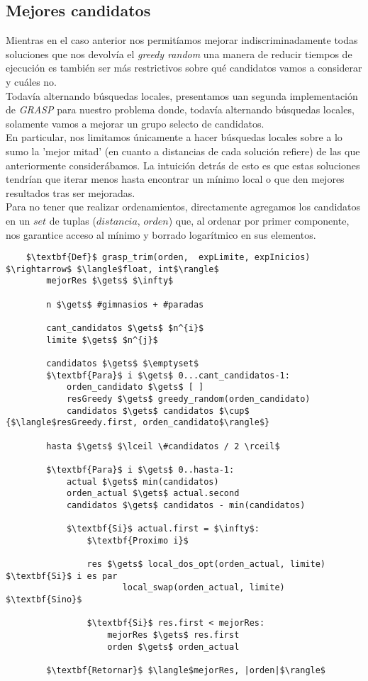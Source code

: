 \subsection{Mejores candidatos}
Mientras en el caso anterior nos permitíamos mejorar indiscriminadamente todas soluciones que nos devolvía el \emph{greedy random} una manera de reducir tiempos de ejecución es también ser más restrictivos sobre qué candidatos vamos a considerar y cuáles no.
\\

Todavía alternando búsquedas locales, presentamos uan segunda implementación de \emph{GRASP} para nuestro problema donde, todavía alternando búsquedas locales, solamente vamos a mejorar un grupo selecto de candidatos.
\\

En particular, nos limitamos únicamente a hacer búsquedas locales sobre a lo sumo la 'mejor mitad' (en cuanto a distancias de cada solución refiere) de las que anteriormente considerábamos. La intuición detrás de esto es que estas soluciones tendrían que iterar menos hasta encontrar un mínimo local o que den mejores resultados tras ser mejoradas.
\\

Para no tener que realizar ordenamientos, directamente agregamos los candidatos en un $set$ de tuplas ($distancia$, $orden$) que, al ordenar por primer componente, nos garantice acceso al mínimo y borrado logarítmico en sus elementos.

\begin{lstlisting}
    $\textbf{Def}$ grasp_trim(orden,  expLimite, expInicios) $\rightarrow$ $\langle$float, int$\rangle$
        mejorRes $\gets$ $\infty$

        n $\gets$ #gimnasios + #paradas

        cant_candidatos $\gets$ $n^{i}$
        limite $\gets$ $n^{j}$

        candidatos $\gets$ $\emptyset$
        $\textbf{Para}$ i $\gets$ 0...cant_candidatos-1:
            orden_candidato $\gets$ [ ]
            resGreedy $\gets$ greedy_random(orden_candidato)
            candidatos $\gets$ candidatos $\cup$ {$\langle$resGreedy.first, orden_candidato$\rangle$}

        hasta $\gets$ $\lceil \#candidatos / 2 \rceil$

        $\textbf{Para}$ i $\gets$ 0..hasta-1:
            actual $\gets$ min(candidatos)
            orden_actual $\gets$ actual.second
            candidatos $\gets$ candidatos - min(candidatos)

            $\textbf{Si}$ actual.first = $\infty$:
                $\textbf{Proximo i}$

                res $\gets$ local_dos_opt(orden_actual, limite) $\textbf{Si}$ i es par
                       local_swap(orden_actual, limite) $\textbf{Sino}$

                $\textbf{Si}$ res.first < mejorRes:
                    mejorRes $\gets$ res.first
                    orden $\gets$ orden_actual

        $\textbf{Retornar}$ $\langle$mejorRes, |orden|$\rangle$
\end{lstlisting}
